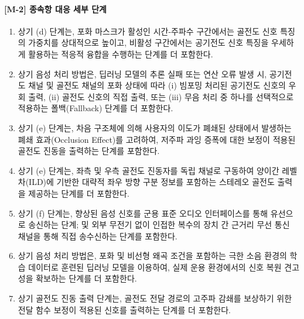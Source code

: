 \documentclass{article}
\begin{document}
\paragraph{[M-2] 종속항 대응 세부 단계}

\begin{enumerate}[label = \textbf{(M.2.\arabic*)}]

    \item 상기 (d) 단계는, 포화 마스크가 활성인
    시간-주파수 구간에서는 골전도 신호 특징의 가중치를
    상대적으로 높이고, 비활성 구간에서는 공기전도 신호
    특징을 우세하게 활용하는 적응적 융합을 수행하는
    단계를 더 포함한다.

    \item 상기 음성 처리 방법은, 딥러닝 모델의 추론
    실패 또는 연산 오류 발생 시, 공기전도 채널 및 골전도 채널의 포화 상태에 따라 (i) 빔포밍 처리된 공기전도 신호의 우회 출력, (ii) 골전도 신호의 직접 출력, 또는 (iii) 무음 처리 중 하나를 선택적으로 적용하는 폴백(Fallback)
    단계를 더 포함한다.

    \item 상기 (e) 단계는, 차음 구조체에 의해 사용자의
    이도가 폐쇄된 상태에서 발생하는 폐쇄 효과(Occlusion Effect)를 고려하여, 저주파 과잉 증폭에 대한 보정이 적용된 골전도
    진동을 출력하는 단계를 포함한다.

    \item 상기 (e) 단계는, 좌측 및 우측 골전도 진동자를
    독립 채널로 구동하여 양이간 레벨차(ILD)에 기반한 대략적 좌우 방향 구분 정보를 포함하는 스테레오 골전도 출력을
    제공하는 단계를 더 포함한다.

    \item 상기 (f) 단계는, 향상된 음성 신호를 군용
    표준 오디오 인터페이스를 통해 유선으로 송신하는
    단계; 및 외부 무전기 없이 인접한 복수의 장치
    간 근거리 무선 통신 채널을 통해 직접 송수신하는
    단계를 포함한다.

    \item 상기 음성 처리 방법은, 포화 및 비선형 왜곡
    조건을 포함하는 극한 소음 환경의 학습 데이터로
    훈련된 딥러닝 모델을 이용하여, 실제 운용 환경에서의
    신호 복원 견고성을 확보하는 단계를 더 포함한다.

    \item 상기 골전도 진동 출력 단계는, 골전도 전달 경로의 고주파 감쇄를 보상하기 위한 전달 함수 보정이 적용된 신호를 출력하는 단계를 더 포함한다.


\end{enumerate}
\end{document}
